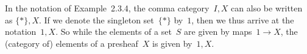 In the notation of Example~2.3.4, the comma category~$I \comma X$ can also be written as $\{ \ast \} \comma X$.
If we denote the singleton set~$\{ \ast \}$ by~$1$, then we thus arrive at the notation~$1 \comma X$.
So while the elements of a set~$S$ are given by maps~$1 \to X$, the (category of) elements of a presheaf~$X$ is given by~$1 \comma X$.



%
%
